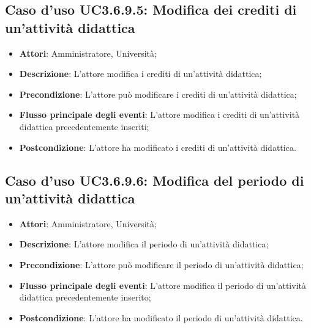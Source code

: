 \subsection{Caso d'uso \texorpdfstring{UC3.6.9.5}{UC3.6.9.5}: Modifica dei crediti di un'attività didattica}
\begin{itemize}
\item \textbf{Attori}: Amministratore, Università;
\item \textbf{Descrizione}: L'attore modifica i crediti di un'attività didattica;

\item \textbf{Precondizione}: L'attore può modificare i crediti di un'attività didattica;

\item \textbf{Flusso principale degli eventi}: L'attore modifica i crediti di un'attività didattica precedentemente inseriti;

\item \textbf{Postcondizione}: L'attore ha modificato i crediti di un'attività didattica.

\end{itemize}
\subsection{Caso d'uso \texorpdfstring{UC3.6.9.6}{UC3.6.9.6}: Modifica del periodo di un'attività didattica}
\begin{itemize}
\item \textbf{Attori}: Amministratore, Università;
\item \textbf{Descrizione}: L'attore modifica il periodo di un'attività didattica;

\item \textbf{Precondizione}: L'attore può modificare il periodo di un'attività didattica;

\item \textbf{Flusso principale degli eventi}: L'attore modifica il periodo di un'attività didattica precedentemente inserito;

\item \textbf{Postcondizione}: L'attore ha modificato il periodo di un'attività didattica.

\end{itemize}
